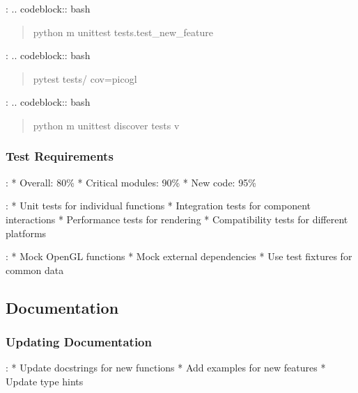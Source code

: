 \documentclass[a4paper,10pt,english,openany,oneside]{sphinxmanual}
\begin{document}
\sphinxAtStartPar
{}:
.. code\sphinxhyphen{}block:: bash
\begin{quote}

\sphinxAtStartPar
python \sphinxhyphen{}m unittest tests.test\_new\_feature
\end{quote}

\sphinxAtStartPar
{}:
.. code\sphinxhyphen{}block:: bash
\begin{quote}

\sphinxAtStartPar
pytest tests/ \textendash{}cov=picogl
\end{quote}

\sphinxAtStartPar
{}:
.. code\sphinxhyphen{}block:: bash
\begin{quote}

\sphinxAtStartPar
python \sphinxhyphen{}m unittest discover tests \sphinxhyphen{}v
\end{quote}


\subsubsection{Test Requirements}
\label{\detokenize{contributing:test-requirements}}
\sphinxAtStartPar
{}:
* Overall: 80\%
* Critical modules: 90\%
* New code: 95\%

\sphinxAtStartPar
{}:
* Unit tests for individual functions
* Integration tests for component interactions
* Performance tests for rendering
* Compatibility tests for different platforms

\sphinxAtStartPar
{}:
* Mock OpenGL functions
* Mock external dependencies
* Use test fixtures for common data


\subsection{Documentation}
\label{\detokenize{contributing:id1}}

\subsubsection{Updating Documentation}
\label{\detokenize{contributing:updating-documentation}}
\sphinxAtStartPar
{}:
* Update docstrings for new functions
* Add examples for new features
* Update type hints
\end{document}
